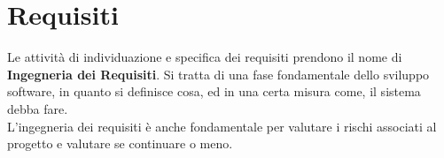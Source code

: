 \chapter{Requisiti}
\label{chap:requisiti}
Le attività di individuazione e specifica dei requisiti prendono il nome di \textbf{Ingegneria dei Requisiti}. Si tratta di una fase fondamentale dello sviluppo software, in quanto si definisce cosa, ed in una certa misura come, il sistema debba fare. \\
L'ingegneria dei requisiti è anche fondamentale per valutare i rischi associati al progetto e valutare se continuare o meno.




